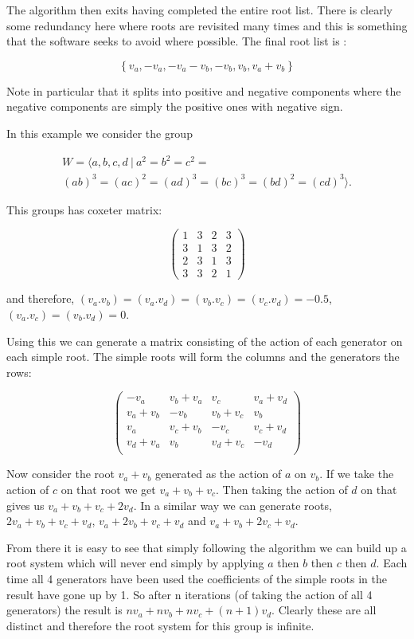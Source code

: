 \documentclass[a4paper,12pt]{article}
\begin{document}
\begin{example}
The algorithm then exits having completed the entire root list. There is clearly some redundancy here where roots are revisited many times and this is something that the software seeks to avoid where possible. The final root list is :

\[\left\{v_a, -v_a, -v_a - v_b, -v_b, v_b, v_a + v_b\right\}\]

Note in particular that it splits into positive and negative components where the negative components are simply the positive ones with negative sign.

\end{example}

\begin{example}
In this example we consider the group 

\begin{align*} 
	W = \langle a, b, c, d \: | \: a^2 = b^2 = c^2 = \\
	(ab)^3 = (ac)^2 = (ad)^3 = (bc)^3 = (bd)^2 = (cd)^3\rangle. 
\end{align*}

This groups has coxeter matrix:

\[ \left( \begin{array}{cccc}
1 & 3 & 2 & 3 \\
3 & 1 & 3 & 2 \\
2 & 3 & 1 & 3 \\
3 & 3 & 2 & 1
\end{array} \right) \]

and therefore, $(v_a.v_b) = (v_a.v_d) = (v_b.v_c) = (v_c.v_d) = -0.5$, $(v_a.v_c) = (v_b.v_d) = 0$.

Using this we can generate a matrix consisting of the action of each generator on each simple root. The simple roots will form the columns and the generators the rows:

\[ \left( \begin{array}{cccc}
-v_a & v_b + v_a & v_c & v_a + v_d \\
v_a + v_b & -v_b & v_b + v_c & v_b \\
v_a & v_c + v_b & -v_c & v_c + v_d \\
v_d + v_a & v_b & v_d + v_c & -v_d \\
\end{array} \right) \]

Now consider the root $v_a + v_b$ generated as the action of $a$ on $v_b$. If we take the action of $c$ on that root we get $v_a + v_b + v_c$. Then taking the action of $d$ on that gives us $v_a + v_b + v_c + 2v_d$. In a similar way we can generate roots, $2v_a + v_b + v_c + v_d$, $v_a + 2v_b + v_c + v_d$ and $v_a + v_b + 2v_c + v_d$.

From there it is easy to see that simply following the algorithm we can build up a root system which will never end simply by applying $a$ then $b$ then $c$ then $d$. Each time all 4 generators have been used the coefficients of the simple roots in the result have gone up by 1. So after n iterations (of taking the action of all 4 generators) the result is $nv_a + nv_b + nv_c + (n + 1)v_d$. Clearly these are all distinct and therefore the root system for this group is infinite.
\end{example}
\end{document}
